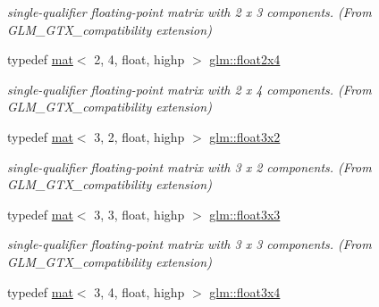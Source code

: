 \begin{DoxyCompactItemize}
\begin{DoxyCompactList}\small\item\em single-\/qualifier floating-\/point matrix with 2 x 3 components. (From G\+L\+M\+\_\+\+G\+T\+X\+\_\+compatibility extension) \end{DoxyCompactList}\item 
\mbox{\label{group__gtx__compatibility_gadd10766e2393a0e0eaf91ae4d2e85f35}} 
typedef \hyperlink{structglm_1_1mat}{mat}$<$ 2, 4, float, highp $>$ \hyperlink{group__gtx__compatibility_gadd10766e2393a0e0eaf91ae4d2e85f35}{glm\+::float2x4}
\begin{DoxyCompactList}\small\item\em single-\/qualifier floating-\/point matrix with 2 x 4 components. (From G\+L\+M\+\_\+\+G\+T\+X\+\_\+compatibility extension) \end{DoxyCompactList}\item 
\mbox{\label{group__gtx__compatibility_ga8e7b0c3f63f470d7a7913453194b0c99}} 
typedef \hyperlink{structglm_1_1mat}{mat}$<$ 3, 2, float, highp $>$ \hyperlink{group__gtx__compatibility_ga8e7b0c3f63f470d7a7913453194b0c99}{glm\+::float3x2}
\begin{DoxyCompactList}\small\item\em single-\/qualifier floating-\/point matrix with 3 x 2 components. (From G\+L\+M\+\_\+\+G\+T\+X\+\_\+compatibility extension) \end{DoxyCompactList}\item 
\mbox{\label{group__gtx__compatibility_ga0c6bbdaa1ebe76fbb55a77d5ca0e2846}} 
typedef \hyperlink{structglm_1_1mat}{mat}$<$ 3, 3, float, highp $>$ \hyperlink{group__gtx__compatibility_ga0c6bbdaa1ebe76fbb55a77d5ca0e2846}{glm\+::float3x3}
\begin{DoxyCompactList}\small\item\em single-\/qualifier floating-\/point matrix with 3 x 3 components. (From G\+L\+M\+\_\+\+G\+T\+X\+\_\+compatibility extension) \end{DoxyCompactList}\item 
\mbox{\label{group__gtx__compatibility_ga53ae5a5af5943b6557eda4a6502e4484}} 
typedef \hyperlink{structglm_1_1mat}{mat}$<$ 3, 4, float, highp $>$ \hyperlink{group__gtx__compatibility_ga53ae5a5af5943b6557eda4a6502e4484}{glm\+::float3x4}

\end{DoxyCompactItemize}
